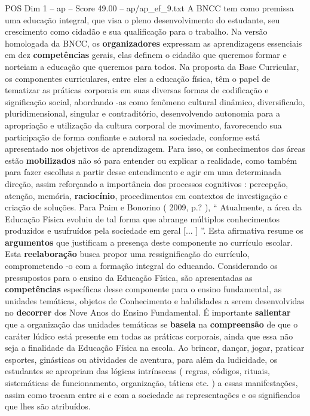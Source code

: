 \begin{textsample}{POS Dim 1 – ap – Score 49.00 – ap/ap\_ef\_9.txt}
A BNCC tem como premissa uma educação integral, que visa o pleno desenvolvimento do estudante, seu crescimento como cidadão e sua qualificação para o trabalho.
Na versão homologada da BNCC, os \textbf{organizadores} expressam as aprendizagens essenciais em dez \textbf{competências} gerais, elas definem o cidadão que queremos formar e norteiam a educação que queremos para todos.
Na proposta da Base Curricular, os componentes curriculares, entre eles a educação física, têm o papel de tematizar as práticas corporais em suas diversas formas de codificação e significação social, abordando -as como fenômeno cultural dinâmico, diversificado, pluridimensional, singular e contraditório, desenvolvendo autonomia para a apropriação e utilização da cultura corporal de movimento, favorecendo sua participação de forma confiante e autoral na sociedade, conforme está apresentado nos objetivos de aprendizagem.
Para isso, os conhecimentos das áreas estão \textbf{mobilizados} não só para entender ou explicar a realidade, como também para fazer escolhas a partir desse entendimento e agir em uma determinada direção, assim reforçando a importância dos processos cognitivos : percepção, atenção, memória, \textbf{raciocínio}, procedimentos em contextos de investigação e criação de soluções.
Para Paim e Bonorino ( 2009, p.? ), “ Atualmente, a área da Educação Física evoluiu de tal forma que abrange múltiplos conhecimentos produzidos e usufruídos pela sociedade em geral [... ] ”.
Esta afirmativa resume os \textbf{argumentos} que justificam a presença deste componente no currículo escolar.
Esta \textbf{reelaboração} busca propor uma ressignificação do currículo, comprometendo -o com a formação integral do educando.
Considerando os pressupostos para o ensino da Educação Física, são apresentadas as \textbf{competências} específicas desse componente para o ensino fundamental, as unidades temáticas, objetos de Conhecimento e habilidades a serem desenvolvidas no \textbf{decorrer} dos Nove Anos do Ensino Fundamental.
É importante \textbf{salientar} que a organização das unidades temáticas se \textbf{baseia} na \textbf{compreensão} de que o caráter lúdico está presente em todas as práticas corporais, ainda que essa não seja a finalidade da Educação Física na escola.
Ao brincar, dançar, jogar, praticar esportes, ginásticas ou atividades de aventura, para além da ludicidade, os estudantes se apropriam das lógicas intrínsecas ( regras, códigos, rituais, sistemáticas de funcionamento, organização, táticas etc. ) a essas manifestações, assim como trocam entre si e com a sociedade as representações e os significados que lhes são atribuídos.

\end{textsample}
